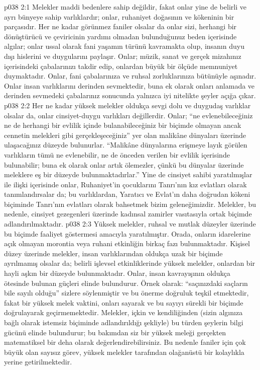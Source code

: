 \vs p038 2:1 Melekler maddi bedenlere sahip değildir, fakat onlar yine de belirli ve ayrı bünyeye sahip varlıklardır; onlar, ruhaniyet doğasının ve kökeninin bir parçasıdır. Her ne kadar görünmez faniler olsalar da onlar sizi, herhangi bir dönüştürücü ve çeviricinin yardımı olmadan bulunduğunuz beden içerisinde algılar; onlar ussal olarak fani yaşamın türünü kavramakta olup, insanın duyu dışı hislerini ve duygularını paylaşır. Onlar; müzik, sanat ve gerçek mizahınız içerisindeki çabalarınızı takdir edip, onlardan büyük bir ölçüde memnuniyet duymaktadır. Onlar, fani çabalarınıza ve ruhsal zorluklarınıza bütünüyle aşınadır. Onlar insan varlıklarını derinden sevmektedir, buna ek olarak onları anlamada ve derinden sevmedeki çabalarınız sonucunda yalnızca iyi nitelikte şeyler açığa çıkar.
\vs p038 2:2 Her ne kadar yüksek melekler oldukça sevgi dolu ve duygudaş varlıklar olsalar da, onlar cinsiyet\hyp{}duygu varlıkları değillerdir. Onlar; “ne evlenebileceğiniz ne de herhangi bir evlilik içinde bulanabileceğiniz bir biçimde olmayan ancak cennetin melekleri gibi gerçekleşeceğiniz” yer olan malikâne dünyaları üzerinde ulaşacağınız düzeyde bulunurlar. “Malikâne dünyalarına erişmeye layık görülen varlıkların tümü ne evlenebilir, ne de önceden verilen bir evlilik içerisinde bulunabilir; buna ek olarak onlar artık ölemezler, çünkü bu dünyalar üzerinde meleklere eş bir düzeyde bulunmaktadırlar.” Yine de cinsiyet sahibi yaratılmışlar ile ilişki içerisinde onlar, Ruhaniyet’in çocuklarını Tanrı’nın kız evlatları olarak tanımlandırsalar da; bu varlıklardan, Yaratıcı ve Evlat’ın daha doğrudan kökeni biçiminde Tanrı’nın evlatları olarak bahsetmek bizim geleneğimizdir. Melekler, bu nedenle, cinsiyet gezegenleri üzerinde kadınsal zamirler vasıtasıyla ortak biçimde adlandırılmaktadır.
\vs p038 2:3 Yüksek melekler, ruhsal ve mutlak düzeyler üzerinde bu biçimde faaliyet göstermesi amacıyla yaratılmıştır. Orada, onların idarelerine açık olmayan morontia veya ruhani etkinliğin birkaç fazı bulunmaktadır. Kişisel düzey üzerinde melekler, insan varlıklarından oldukça uzak bir biçimde ayrılmamış olsalar da; belirli işlevsel etkinliklerinde yüksek melekler, onlardan bir hayli aşkın bir düzeyde bulunmaktadır. Onlar, insan kavrayışının oldukça ötesinde bulunan güçleri elinde bulundurur. Örnek olarak: “saçınızdaki saçların bile sayılı olduğu” sizlere söylenmiştir ve bu önerme doğruluk teşkil etmektedir, fakat bir yüksek melek vaktini, onları sayarak ve bu sayıyı sürekli bir biçimde doğrulayarak geçirmemektedir. Melekler, içkin ve kendiliğinden (sizin algınıza bağlı olarak istemsiz biçiminde adlandırıldığı şekliyle) bu türden şeylerin bilgi gücünü elinde bulundurur; bu bakımdan siz bir yüksek meleği gerçekten matematiksel bir deha olarak değerlendirebilirsiniz. Bu nedenle faniler için çok büyük olan sayısız görev, yüksek melekler tarafından olağanüstü bir kolaylıkla yerine getirilmektedir.
